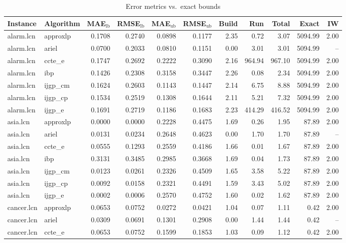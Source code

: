 \begin{table}[ht]
\centering
\scriptsize
\caption{Error metrics vs.\ exact bounds}
\begin{tabular}{llrrrrrrrrr}
\toprule
Instance & Algorithm & MAE$_{\text{lb}}$ & RMSE$_{\text{lb}}$ & MAE$_{\text{ub}}$ & RMSE$_{\text{ub}}$ & Build & Run & Total & Exact & IW \\
\midrule
alarm.lcn & approxlp & 0.1708 & 0.2740 & 0.0898 & 0.1177 & 2.35 & 0.72 & 3.07 & 5094.99 & 2.00 \\
alarm.lcn & ariel & 0.0700 & 0.2033 & 0.0810 & 0.1151 & 0.00 & 3.01 & 3.01 & 5094.99 & -- \\
alarm.lcn & ccte_e & 0.1747 & 0.2692 & 0.2222 & 0.3090 & 2.16 & 964.94 & 967.10 & 5094.99 & 2.00 \\
alarm.lcn & ibp & 0.1426 & 0.2308 & 0.3158 & 0.3447 & 2.26 & 0.08 & 2.34 & 5094.99 & 2.00 \\
alarm.lcn & ijgp_cm & 0.1624 & 0.2603 & 0.1143 & 0.1447 & 2.14 & 6.75 & 8.88 & 5094.99 & 2.00 \\
alarm.lcn & ijgp_cp & 0.1534 & 0.2519 & 0.1308 & 0.1644 & 2.11 & 5.21 & 7.32 & 5094.99 & 2.00 \\
alarm.lcn & ijgp_e & 0.1691 & 0.2719 & 0.1186 & 0.1683 & 2.23 & 414.29 & 416.52 & 5094.99 & 2.00 \\
asia.lcn & approxlp & 0.0000 & 0.0000 & 0.2228 & 0.4475 & 1.69 & 0.26 & 1.95 & 87.89 & 2.00 \\
asia.lcn & ariel & 0.0131 & 0.0234 & 0.2648 & 0.4623 & 0.00 & 1.70 & 1.70 & 87.89 & -- \\
asia.lcn & ccte_e & 0.0555 & 0.1293 & 0.2559 & 0.4186 & 1.66 & 0.01 & 1.67 & 87.89 & 2.00 \\
asia.lcn & ibp & 0.3131 & 0.3485 & 0.2985 & 0.3668 & 1.69 & 0.04 & 1.73 & 87.89 & 2.00 \\
asia.lcn & ijgp_cm & 0.0123 & 0.0261 & 0.2326 & 0.4509 & 1.65 & 3.58 & 5.22 & 87.89 & 2.00 \\
asia.lcn & ijgp_cp & 0.0092 & 0.0158 & 0.2321 & 0.4491 & 1.59 & 3.43 & 5.02 & 87.89 & 2.00 \\
asia.lcn & ijgp_e & 0.0002 & 0.0006 & 0.2570 & 0.4752 & 1.60 & 0.02 & 1.62 & 87.89 & 2.00 \\
cancer.lcn & approxlp & 0.0653 & 0.0752 & 0.0272 & 0.0421 & 1.04 & 0.07 & 1.11 & 0.42 & 2.00 \\
cancer.lcn & ariel & 0.0309 & 0.0691 & 0.1301 & 0.2908 & 0.00 & 1.44 & 1.44 & 0.42 & -- \\
cancer.lcn & ccte_e & 0.0653 & 0.0752 & 0.1599 & 0.1853 & 1.03 & 0.09 & 1.12 & 0.42 & 2.00 \\

\end{tabular}
\end{table}
